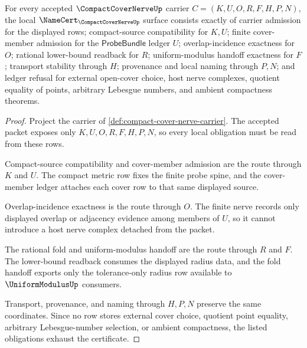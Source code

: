 \begin{theorem}
\label{thm:compact-cover-nerve-namecert-obligations}
For every accepted $\CompactCoverNerveUp$ carrier $C=(K,U,O,R,F,H,P,N)$, the local $\NameCert_{\CompactCoverNerveUp}$ surface consists exactly of carrier admission for the displayed rows; compact-source compatibility for $K,U$; finite cover-member admission for the $\mathsf{ProbeBundle}$ ledger $U$; overlap-incidence exactness for $O$; rational lower-bound readback for $R$; uniform-modulus handoff exactness for $F$; transport stability through $H$; provenance and local naming through $P,N$; and ledger refusal for external open-cover choice, host nerve complexes, quotient equality of points, arbitrary Lebesgue numbers, and ambient compactness theorems.
\end{theorem}
\begin{proof}
Project the carrier of \autoref{def:compact-cover-nerve-carrier}. The accepted packet exposes only $K,U,O,R,F,H,P,N$, so every local obligation must be read from these rows.

Compact-source compatibility and cover-member admission are the route through $K$ and $U$. The compact metric row fixes the finite probe spine, and the cover-member ledger attaches each cover row to that same displayed source.

Overlap-incidence exactness is the route through $O$. The finite nerve records only displayed overlap or adjacency evidence among members of $U$, so it cannot introduce a host nerve complex detached from the packet.

The rational fold and uniform-modulus handoff are the route through $R$ and $F$. The lower-bound readback consumes the displayed radius data, and the fold handoff exports only the tolerance-only radius row available to $\UniformModulusUp$ consumers.

Transport, provenance, and naming through $H,P,N$ preserve the same coordinates. Since no row stores external cover choice, quotient point equality, arbitrary Lebesgue-number selection, or ambient compactness, the listed obligations exhaust the certificate.
\end{proof}

